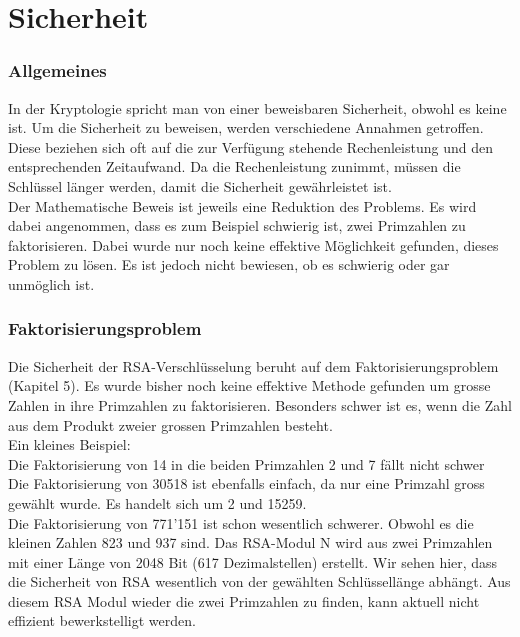 \part{Sicherheit}
\section{Allgemeines}
In der Kryptologie spricht man von einer beweisbaren Sicherheit, obwohl es keine ist. Um die Sicherheit zu beweisen, werden verschiedene Annahmen getroffen. Diese beziehen sich oft auf die zur Verfügung stehende Rechenleistung und den entsprechenden Zeitaufwand. Da die Rechenleistung zunimmt, müssen die Schlüssel länger werden, damit die Sicherheit gewährleistet ist. \\
Der Mathematische Beweis ist jeweils eine Reduktion des Problems. Es wird dabei angenommen, dass es  zum Beispiel schwierig ist, zwei Primzahlen zu faktorisieren. Dabei wurde nur noch keine effektive Möglichkeit gefunden, dieses Problem zu lösen. Es ist jedoch nicht bewiesen, ob es schwierig oder gar unmöglich ist.
%
\section{Faktorisierungsproblem}
Die Sicherheit der RSA-Verschlüsselung beruht auf dem Faktorisierungsproblem\cite{rsa_and_public_key} (Kapitel 5). Es wurde bisher noch keine effektive Methode gefunden um grosse Zahlen in ihre Primzahlen zu faktorisieren. Besonders schwer ist es, wenn die Zahl aus dem Produkt zweier grossen Primzahlen besteht. \\
Ein kleines Beispiel:\\
Die Faktorisierung von 14 in die beiden Primzahlen 2 und 7 fällt nicht schwer\\
Die Faktorisierung von 30518 ist ebenfalls einfach, da nur eine Primzahl gross gewählt wurde. Es handelt sich um 2 und 15259. \\
Die Faktorisierung von 771'151 ist schon wesentlich schwerer. Obwohl es die kleinen Zahlen 823 und 937 sind. Das RSA-Modul N wird aus zwei Primzahlen mit einer Länge von 2048 Bit (617 Dezimalstellen) erstellt. Wir sehen hier, dass die Sicherheit von RSA wesentlich von der gewählten Schlüssellänge abhängt. Aus diesem RSA Modul wieder die zwei Primzahlen zu finden, kann aktuell nicht effizient bewerkstelligt werden.
%
